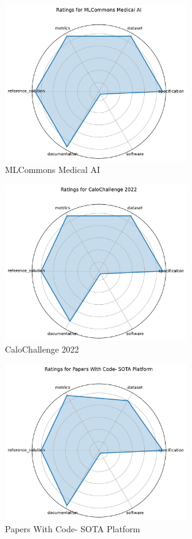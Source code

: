 \documentclass{article}
\begin{document}
\begin{figure}[h!]
  \centering
  \includegraphics[width=0.7\textwidth]{MLCommons Medical AI_radar.pdf}
  \caption{MLCommons Medical AI}
\end{figure}

\begin{figure}[h!]
  \centering
  \includegraphics[width=0.7\textwidth]{CaloChallenge 2022_radar.pdf}
  \caption{CaloChallenge 2022}
\end{figure}

\begin{figure}[h!]
  \centering
  \includegraphics[width=0.7\textwidth]{Papers With Code- SOTA Platform_radar.pdf}
  \caption{Papers With Code- SOTA Platform}
\end{figure}
\end{document}

